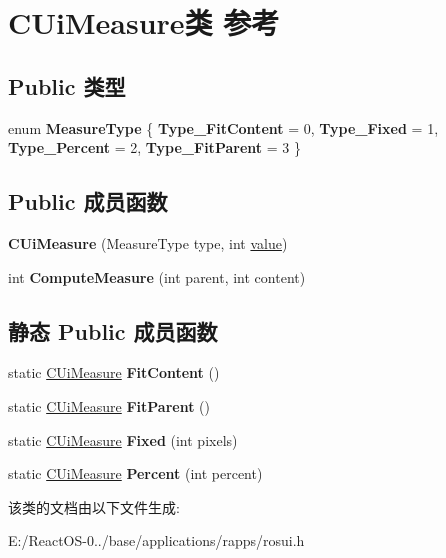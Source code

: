 \hypertarget{class_c_ui_measure}{}\section{C\+Ui\+Measure类 参考}
\label{class_c_ui_measure}
\subsection*{Public 类型}
\begin{DoxyCompactItemize}
\item 
\mbox{\label{class_c_ui_measure_ae66521c3c82043aae981240924c26ca8}} 
enum {\bfseries Measure\+Type} \{ {\bfseries Type\+\_\+\+Fit\+Content} = 0, 
{\bfseries Type\+\_\+\+Fixed} = 1, 
{\bfseries Type\+\_\+\+Percent} = 2, 
{\bfseries Type\+\_\+\+Fit\+Parent} = 3
 \}
\end{DoxyCompactItemize}
\subsection*{Public 成员函数}
\begin{DoxyCompactItemize}
\item 
\mbox{\label{class_c_ui_measure_a2d9949162c406b303016c6ba41aecfca}} 
{\bfseries C\+Ui\+Measure} (Measure\+Type type, int \hyperlink{unionvalue}{value})
\item 
\mbox{\label{class_c_ui_measure_ada8b944d3a405f628bca31348b3051e1}} 
int {\bfseries Compute\+Measure} (int parent, int content)
\end{DoxyCompactItemize}
\subsection*{静态 Public 成员函数}
\begin{DoxyCompactItemize}
\item 
\mbox{\label{class_c_ui_measure_a330143ba5a80355079d872bc5c100d62}} 
static \hyperlink{class_c_ui_measure}{C\+Ui\+Measure} {\bfseries Fit\+Content} ()
\item 
\mbox{\label{class_c_ui_measure_a052945e2606d41b122c01a7020517006}} 
static \hyperlink{class_c_ui_measure}{C\+Ui\+Measure} {\bfseries Fit\+Parent} ()
\item 
\mbox{\label{class_c_ui_measure_a57e233df1d9092f51092da7b3598b75d}} 
static \hyperlink{class_c_ui_measure}{C\+Ui\+Measure} {\bfseries Fixed} (int pixels)
\item 
\mbox{\label{class_c_ui_measure_a9db3e24c7ef76f6a7464b9309a927f3d}} 
static \hyperlink{class_c_ui_measure}{C\+Ui\+Measure} {\bfseries Percent} (int percent)
\end{DoxyCompactItemize}


该类的文档由以下文件生成\+:\begin{DoxyCompactItemize}
\item 
E\+:/\+React\+O\+S-\/0../base/applications/rapps/rosui.\+h\end{DoxyCompactItemize}
